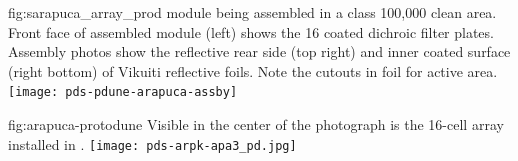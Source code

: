 
\begin{dunefigure}{fig:sarapuca_array_prod}
{  module being assembled in a class 100,000 clean area.  Front face of assembled module (left) shows the 16 coated dichroic filter plates.  Assembly photos show the reflective rear side (top right) and inner coated surface (right bottom) of Vikuiti reflective foils.  Note the cutouts in foil for  active area.}
	\texttt{[image: pds-pdune-arapuca-assby]}
\end{dunefigure}


\begin{dunefigure}{fig:arapuca-protodune}
{Visible in the center of the photograph is the 16-cell  array installed in .} 
\texttt{[image: pds-arpk-apa3\_pd.jpg]} 
\end{dunefigure}





